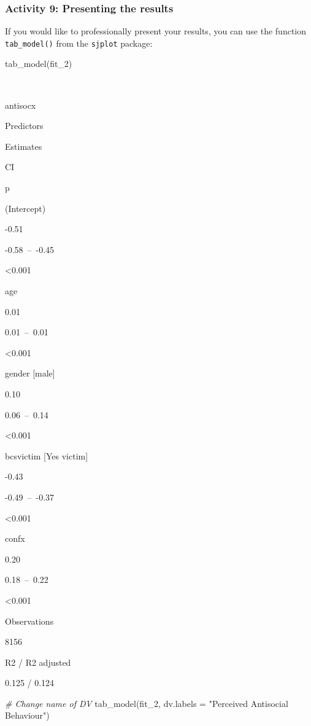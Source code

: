 \documentclass[
]{book}
\newenvironment{Shaded}{\begin{snugshade}}{\end{snugshade}}
\newcommand{\AttributeTok}[1]{\textcolor[rgb]{0.77,0.63,0.00}{#1}}
\newcommand{\CommentTok}[1]{\textcolor[rgb]{0.56,0.35,0.01}{\textit{#1}}}
\newcommand{\FunctionTok}[1]{\textcolor[rgb]{0.00,0.00,0.00}{#1}}
\newcommand{\NormalTok}[1]{#1}
\newcommand{\StringTok}[1]{\textcolor[rgb]{0.31,0.60,0.02}{#1}}
\begin{document}
\hypertarget{activity-9-presenting-the-results}{%
\subsubsection{Activity 9: Presenting the results}\label{activity-9-presenting-the-results}}

If you would like to professionally present your results, you can use the function \texttt{tab\_model()} from the \texttt{sjplot} package:

\begin{Shaded}
\begin{Highlighting}[]
\FunctionTok{tab\_model}\NormalTok{(fit\_2)}
\end{Highlighting}
\end{Shaded}

~

antisocx

Predictors

Estimates

CI

p

(Intercept)

-0.51

-0.58~--~-0.45

\textless0.001

age

0.01

0.01~--~0.01

\textless0.001

gender {[}male{]}

0.10

0.06~--~0.14

\textless0.001

bcsvictim {[}Yes victim{]}

-0.43

-0.49~--~-0.37

\textless0.001

confx

0.20

0.18~--~0.22

\textless0.001

Observations

8156

R2 / R2 adjusted

0.125 / 0.124

\begin{Shaded}
\begin{Highlighting}[]
\CommentTok{\# Change name of DV}
\FunctionTok{tab\_model}\NormalTok{(fit\_2, }\AttributeTok{dv.labels =} \StringTok{"Perceived Antisocial Behaviour"}\NormalTok{)}
\end{Highlighting}
\end{Shaded}
\end{document}
